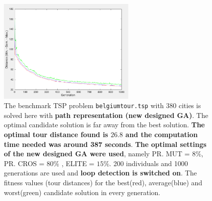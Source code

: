 \begin{figure}[!]
  \centering
    \includegraphics[width=0.6\textwidth]{../figures/figures_question_4/path_vraag4_on_gen}
      \caption{The benchmark TSP problem \texttt{belgiumtour.tsp} with 380 cities is solved here with \textbf{path representation (new designed GA)}. The optimal candidate solution is far away from the best solution. \textbf{The optimal tour distance found is $\mathbf{26.8}$ and the computation time needed was around 387 seconds}. \textbf{The optimal settings of the new designed GA were used}, namely PR. MUT = $8\%$, PR. CROS = $80\%$ , ELITE = $15\%$. 200 individuals and 1000 generations are used and \textbf{loop detection is switched on}. The fitness values (tour distances) for the best(red), average(blue) and worst(green) candidate solution in every generation.}
      \label{fig:path_vraag4_on_gen}
\end{figure}















